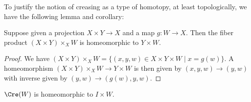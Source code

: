 To justify the notion of creasing as a type of homotopy, at least topologically, we have the following lemma and corollary:

\begin{lemma}
	Suppose given a projection $X \times Y \to X$ and a map $g \colon W \to X$.
	Then the fiber product $(X \times Y) \times_X W$ is homeomorphic to $Y \times W$.
\end{lemma}

\begin{proof}
	We have $(X \times Y) \times_X W = \{(x,y,w) \in X \times Y \times W \mid x = g(w)\}$.
	A homeomorphism $(X \times Y) \times_X W \to Y \times W$ is then given by $(x,y,w) \to (y,w)$ with inverse given by $(y,w) \to (g(w),y,w)$.
\end{proof}

\begin{corollary}
	$\Cre(W)$ is homeomorphic to $I \times W$.
\end{corollary}

